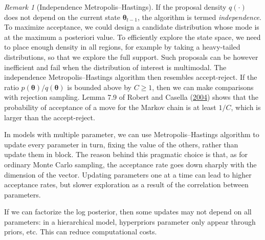 \documentclass[
  11pt,
  letterpaper,
]{scrbook}
\theoremstyle{definition}
\theoremstyle{definition}
\theoremstyle{definition}
\theoremstyle{plain}
\theoremstyle{remark}
\newtheorem*{remark}{Remark}
\begin{document}
\begin{remark}[Independence Metropolis--Hastings]

If the proposal density \(q(\cdot)\) does not depend on the current
state \(\boldsymbol{\theta}_{t-1}\), the algorithm is termed
\emph{independence}. To maximize acceptance, we could design a candidate
distribution whose mode is at the maximum a posteriori value. To
efficiently explore the state space, we need to place enough density in
all regions, for example by taking a heavy-tailed distributions, so that
we explore the full support. Such proposals can be however inefficient
and fail when the distribution of interest is multimodal. The
independence Metropolis--Hastings algorithm then resembles
accept-reject. If the ratio
\(p(\boldsymbol{\theta})/q(\boldsymbol{\theta})\) is bounded above by
\(C \geq 1\), then we can make comparisons with rejection sampling.
Lemma 7.9 of Robert and Casella
(\protect\hyperlink{ref-Robert.Casella:2004}{2004}) shows that the
probability of acceptance of a move for the Markov chain is at least
\(1/C\), which is larger than the accept-reject.

\end{remark}

In models with multiple parameter, we can use Metropolis--Hastings
algorithm to update every parameter in turn, fixing the value of the
others, rather than update them in block. The reason behind this
pragmatic choice is that, as for ordinary Monte Carlo sampling, the
acceptance rate goes down sharply with the dimension of the vector.
Updating parameters one at a time can lead to higher acceptance rates,
but slower exploration as a result of the correlation between
parameters.

If we can factorize the log posterior, then some updates may not depend
on all parameters: in a hierarchical model, hyperpriors parameter only
appear through priors, etc. This can reduce computational costs.
\end{document}
